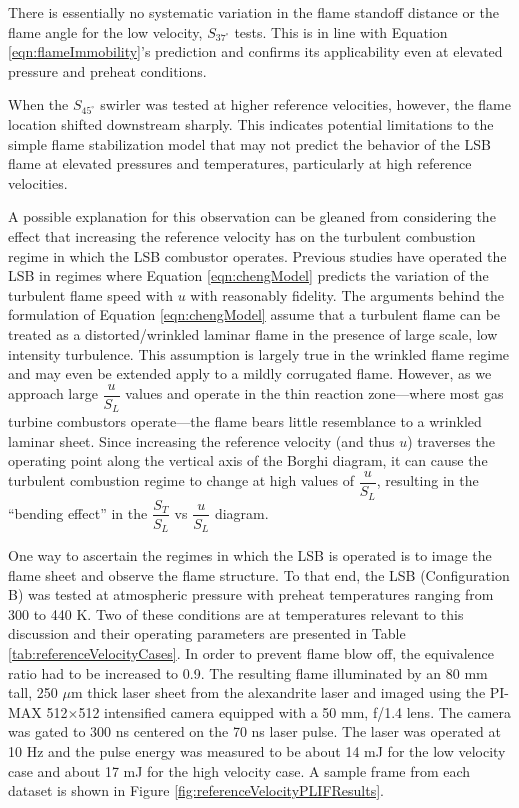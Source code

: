 


There is essentially no systematic variation in the flame standoff distance or the flame angle for the low velocity, \(S_{37^\circ}\) tests.
This is in line with Equation \ref{eqn:flameImmobility}'s prediction and confirms its applicability even at elevated pressure and preheat conditions.

When the \(S_{45^\circ}\) swirler was tested at higher reference velocities, however, the flame location shifted downstream sharply.
This indicates potential limitations to the simple flame stabilization model that may not predict the behavior of the LSB flame at elevated pressures and temperatures, particularly at high reference velocities.

A possible explanation for this observation can be gleaned from considering the effect that increasing the reference velocity has on the turbulent combustion regime in which the LSB combustor operates.
Previous studies have operated the LSB in regimes where Equation \ref{eqn:chengModel} predicts the variation of the turbulent flame speed with \(u\) with reasonably fidelity.
The arguments behind the formulation of Equation \ref{eqn:chengModel} assume that a turbulent flame can be treated as a distorted/wrinkled laminar flame in the presence of large scale, low intensity turbulence.
This assumption is largely true in the wrinkled flame regime and may even be extended apply to a mildly corrugated flame.
However, as we approach large \(\dfrac{ u }{ S_L }\) values and operate in the thin reaction zone---where most gas turbine combustors operate---the flame bears little resemblance to a wrinkled laminar sheet.
Since increasing the reference velocity (and thus \(u\)) traverses the operating point along the vertical axis of the Borghi diagram, it can cause the turbulent combustion regime to change at high values of \(\dfrac{ u }{ S_L }\), resulting in the ``bending effect'' in the \(\dfrac{ S_T }{ S_L }\) vs \(\dfrac{ u }{ S_L }\) diagram.\cite{1996-kobayashi,2006-law}

One way to ascertain the regimes in which the LSB is operated is to image the flame sheet and observe the flame structure.
To that end, the LSB (Configuration B) was tested at atmospheric pressure with preheat temperatures ranging from 300 to 440 K.
Two of these conditions are at temperatures relevant to this discussion and their operating parameters are presented in Table \ref{tab:referenceVelocityCases}.
In order to prevent flame blow off, the equivalence ratio had to be increased to 0.9.
The resulting flame illuminated by an 80 mm tall, 250 \(\mu\)m thick laser sheet from the alexandrite laser and imaged using the PI-MAX 512\(\times\)512 intensified camera equipped with a 50 mm, f/1.4 lens.
The camera was gated to 300 ns centered on the 70 ns laser pulse.
The laser was operated at 10 Hz and the pulse energy was measured to be about 14 mJ for the low velocity case and about 17 mJ for the high velocity case.
A sample frame from each dataset is shown in Figure \ref{fig:referenceVelocityPLIFResults}. 

